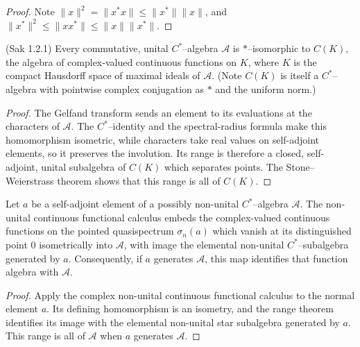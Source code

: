\begin{proof}
  \leanok
  Note $\|x\|^{2}=\|x^{*}x\|\le \|x^{*}\|\|x\|$, and $\|x^{*}\|^{2}\le \|xx^{*}\|\le \|x\|\|x^{*}\|$.
\end{proof}

\begin{theorem}
  \label{thm:comm_cstar_cts_fcns_Sak_1_2_1} (Sak 1.2.1)
  \mathlibok
  Every commutative, unital $C^{*}$--algebra $\mathcal{A}$ is $*$--isomorphic to $C(K)$,
  the algebra of complex-valued continuous functions on $K$, where $K$ is the compact Hausdorff
  space of maximal ideals of $\mathcal{A}$. (Note $C(K)$ is itself a $C^{*}$--algebra with pointwise
  complex conjugation as $*$ and the uniform norm.)
\end{theorem}

\begin{proof}
  \leanok
  The Gelfand transform sends an element to its evaluations at the characters of $\mathcal A$.
  The $C^{*}$--identity and the spectral-radius formula make this homomorphism isometric, while
  characters take real values on self-adjoint elements, so it preserves the involution. Its range
  is therefore a closed, self-adjoint, unital subalgebra of $C(K)$ which separates points.
  The Stone--Weierstrass theorem shows that this range is all of $C(K)$.
\end{proof}

\begin{corollary}
  \label{cor:spec_sa_homeo_spec_cstar}
  \mathlibok
  Let $a$ be a self-adjoint element of a possibly non-unital $C^{*}$--algebra $\mathcal A$.
  The non-unital continuous functional calculus embeds the complex-valued continuous functions on
  the pointed quasispectrum $\sigma_{n}(a)$ which vanish at its distinguished point $0$ isometrically
  into $\mathcal A$, with image the elemental non-unital $C^{*}$--subalgebra generated by $a$.
  Consequently, if $a$ generates $\mathcal A$, this map identifies that function algebra with
  $\mathcal A$.
\end{corollary}

\begin{proof}
  \leanok
  Apply the complex non-unital continuous functional calculus to the normal element $a$. Its
  defining homomorphism is an isometry, and the range theorem identifies its image with the
  elemental non-unital star subalgebra generated by $a$. This range is all of $\mathcal A$ when
  $a$ generates $\mathcal A$.
\end{proof}

